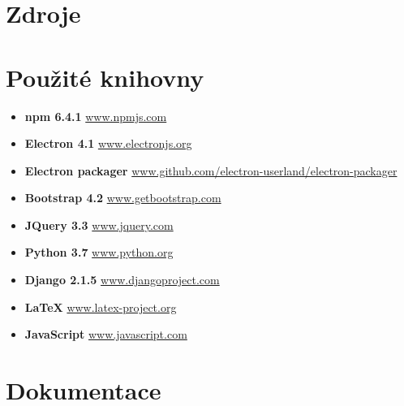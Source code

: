 \section{Zdroje}
\hypertarget{pouux17eituxe9-knihovny}{%
\section*{Použité knihovny}\label{pouux17eituxe9-knihovny}}

\begin{itemize}
\tightlist
\item
  \textbf{npm 6.4.1} \href{https://www.npmjs.com/}{www.npmjs.com}
\item
  \textbf{Electron 4.1}
  \href{https://electronjs.org/}{www.electronjs.org}
\item
  \textbf{Electron packager}
  \href{https://github.com/electron-userland/electron-packager}{www.github.com/electron-userland/electron-packager}
\item
  \textbf{Bootstrap 4.2}
  \href{https://getbootstrap.com/}{www.getbootstrap.com}
\item
  \textbf{JQuery 3.3} \href{https://jquery.com/}{www.jquery.com}
\item
  \textbf{Python 3.7} \href{https://www.python.org/}{www.python.org}
\item
  \textbf{Django 2.1.5}
  \href{https://www.djangoproject.com/}{www.djangoproject.com}
\item
  \textbf{LaTeX}
  \href{https://www.latex-project.org/}{www.latex-project.org}
\item
  \textbf{JavaScript}
  \href{https://www.javascript.com}{www.javascript.com}
\end{itemize}

\hypertarget{dokumentace}{%
\section*{Dokumentace}\label{dokumentace}}

